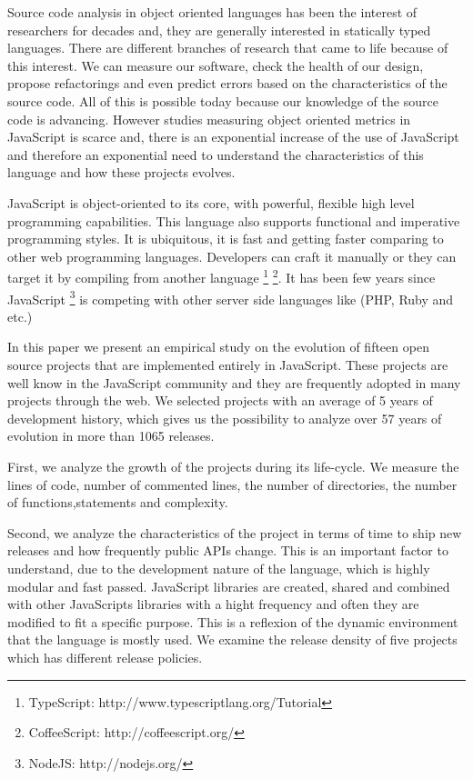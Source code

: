 
Source code analysis in object oriented languages has been the interest of researchers for decades and, they are generally interested in statically typed languages. There are different branches of research that came to life because of this interest. We can measure our software, check the health of our design, propose refactorings and even predict errors based on the characteristics of the source code. All of this is possible today because our knowledge of the source code is advancing.  However studies measuring object oriented metrics in JavaScript is scarce \cite{Richards:2010:ADB:1809028.1806598 , 6320536}and, there is an exponential increase of the use of JavaScript and therefore an exponential need to understand the characteristics of this language and how these projects evolves.

JavaScript is object-oriented to its core, with powerful, flexible high level programming capabilities. This language also supports functional and imperative programming styles. It is ubiquitous, it is fast and getting faster comparing to other web programming languages. Developers can craft it manually or they can target it by compiling from another language \footnote{TypeScript: http://www.typescriptlang.org/Tutorial} \footnote{CoffeeScript: http://coffeescript.org/}. It has been few years since JavaScript \footnote{NodeJS: http://nodejs.org/} is competing with other server side languages like (PHP, Ruby and etc.)

In this paper we present an empirical study on the evolution of fifteen open source projects that are implemented entirely in JavaScript. These projects are well know in the JavaScript community and they are frequently adopted in many projects through the web. We selected projects with an average of 5 years of development history, which gives us the possibility to analyze over 57 years of evolution in more than 1065 releases. 

First, we analyze the growth of the projects during its life-cycle. We measure the lines of code, number of commented lines, the number of directories, the number of functions,statements and complexity. 

Second, we analyze the characteristics of the project in terms of time to ship new releases and how frequently public APIs change. This is an important factor to understand, due to the development nature of the language, which is highly modular and fast passed. JavaScript libraries are created, shared and combined with other JavaScripts libraries with a hight frequency and often they are modified to fit a specific purpose. This is a reflexion of the dynamic environment that the language is mostly used. We examine the release density of five projects which has different release policies. 

